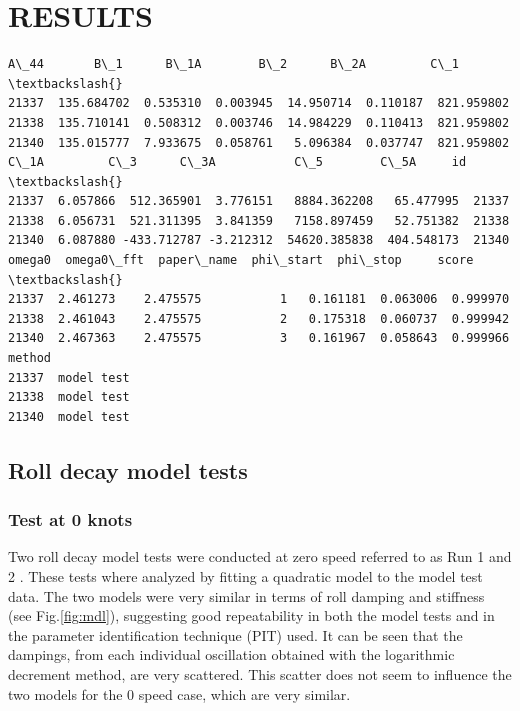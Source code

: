 \section*{RESULTS}\label{results}
\begin{tcolorbox}[breakable, size=fbox, boxrule=.5pt, pad at break*=1mm, opacityfill=0]
\begin{Verbatim}[commandchars=\\\{\}]
A\_44       B\_1      B\_1A        B\_2      B\_2A         C\_1  \textbackslash{}
21337  135.684702  0.535310  0.003945  14.950714  0.110187  821.959802
21338  135.710141  0.508312  0.003746  14.984229  0.110413  821.959802
21340  135.015777  7.933675  0.058761   5.096384  0.037747  821.959802
C\_1A         C\_3      C\_3A           C\_5        C\_5A     id  \textbackslash{}
21337  6.057866  512.365901  3.776151   8884.362208   65.477995  21337
21338  6.056731  521.311395  3.841359   7158.897459   52.751382  21338
21340  6.087880 -433.712787 -3.212312  54620.385838  404.548173  21340
omega0  omega0\_fft  paper\_name  phi\_start  phi\_stop     score  \textbackslash{}
21337  2.461273    2.475575           1   0.161181  0.063006  0.999970
21338  2.461043    2.475575           2   0.175318  0.060737  0.999942
21340  2.467363    2.475575           3   0.161967  0.058643  0.999966
method
21337  model test
21338  model test
21340  model test
\end{Verbatim}
\end{tcolorbox}
\subsection*{Roll decay model tests}\label{roll-decay-model-tests}
\subsubsection*{Test at 0 knots}\label{test-at-0-knots}
Two roll decay model tests were conducted at zero speed referred to as
Run 1 and 2 \citep{7505983/5DP3HN8F}.
These tests where analyzed by fitting a quadratic model
to the model test data. The two models were very similar in terms of
roll damping and stiffness (see Fig.\ref{fig:mdl}), suggesting
good repeatability in both the model tests and in the parameter
identification technique (PIT) used. It can be seen that the dampings,
from each individual oscillation obtained with the logarithmic decrement
method, are very scattered. This scatter does not seem to influence the
two models for the 0 speed case, which are very similar.
